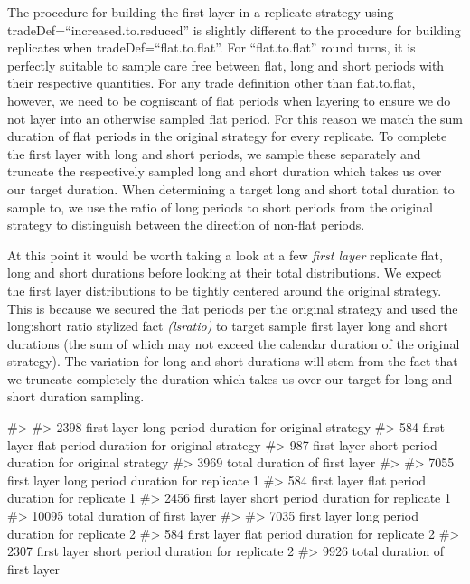 The procedure for building the first layer in a replicate strategy using
tradeDef=``increased.to.reduced'' is slightly different to the procedure
for building replicates when tradeDef=``flat.to.flat''. For
``flat.to.flat'' round turns, it is perfectly suitable to sample care
free between flat, long and short periods with their respective
quantities. For any trade definition other than flat.to.flat, however,
we need to be cogniscant of flat periods when layering to ensure we do
not layer into an otherwise sampled flat period. For this reason we
match the sum duration of flat periods in the original strategy for
every replicate. To complete the first layer with long and short
periods, we sample these separately and truncate the respectively
sampled long and short duration which takes us over our target duration.
When determining a target long and short total duration to sample to, we
use the ratio of long periods to short periods from the original
strategy to distinguish between the direction of non-flat periods.

At this point it would be worth taking a look at a few \emph{first
layer} replicate flat, long and short durations before looking at their
total distributions. We expect the first layer distributions to be
tightly centered around the original strategy. This is because we
secured the flat periods per the original strategy and used the
long:short ratio stylized fact \emph{(lsratio)} to target sample first
layer long and short durations (the sum of which may not exceed the
calendar duration of the original strategy). The variation for long and
short durations will stem from the fact that we truncate completely the
duration which takes us over our target for long and short duration
sampling.

\begin{Schunk}
\begin{Soutput}
#> 
#>  2398 first layer long period duration for original strategy 
#>  584 first layer flat period duration for original strategy 
#>  987 first layer short period duration for original strategy 
#>  3969 total duration of first layer 
#>  
#>  7055 first layer long period duration for replicate 1 
#>  584 first layer flat period duration for replicate 1 
#>  2456 first layer short period duration for replicate 1 
#>  10095 total duration of first layer 
#>  
#>  7035 first layer long period duration for replicate 2 
#>  584 first layer flat period duration for replicate 2 
#>  2307 first layer short period duration for replicate 2 
#>  9926 total duration of first layer
\end{Soutput}
\end{Schunk}

